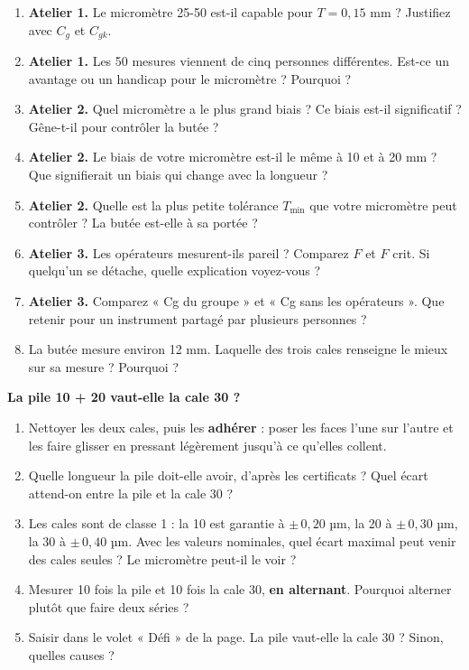 \documentclass[10pt,a4paper]{article}
\begin{document}
\newpage
{}
\begin{enumerate}[label=\textcolor{cyan}{\textbf{Q\arabic*.}},leftmargin=22pt]
\item \textbf{Atelier 1.} Le micromètre 25-50 est-il capable pour $T = 0{,}15$ mm ? Justifiez avec $C_g$ et $C_{gk}$.\reponse
\item \textbf{Atelier 1.} Les 50 mesures viennent de cinq personnes différentes. Est-ce un avantage ou un handicap pour le micromètre ? Pourquoi ?\reponse[2]
\item \textbf{Atelier 2.} Quel micromètre a le plus grand biais ? Ce biais est-il significatif ? Gêne-t-il pour contrôler la butée ?\reponse[2]
\item \textbf{Atelier 2.} Le biais de votre micromètre est-il le même à 10 et à 20 mm ? Que signifierait un biais qui change avec la longueur ?\reponse[2]
\item \textbf{Atelier 2.} Quelle est la plus petite tolérance $T_{\min}$ que votre micromètre peut contrôler ? La butée est-elle à sa portée ?\reponse
\item \textbf{Atelier 3.} Les opérateurs mesurent-ils pareil ? Comparez $F$ et $F$ crit. Si quelqu'un se détache, quelle explication voyez-vous ?\reponse[2]
\item \textbf{Atelier 3.} Comparez « Cg du groupe » et « Cg sans les opérateurs ». Que retenir pour un instrument partagé par plusieurs personnes ?\reponse[2]
\item La butée mesure environ 12 mm. Laquelle des trois cales renseigne le mieux sur sa mesure ? Pourquoi ?\reponse
\end{enumerate}

\begin{tcolorbox}[defi]
\textbf{La pile 10 + 20 vaut-elle la cale 30 ?}
\begin{enumerate}[label=\textbf{\alph*.},leftmargin=14pt]
\item Nettoyer les deux cales, puis les \textbf{adhérer} : poser les faces l'une sur l'autre et les faire glisser en pressant légèrement jusqu'à ce qu'elles collent.
\item Quelle longueur la pile doit-elle avoir, d'après les certificats ? Quel écart attend-on entre la pile et la cale 30 ?
\item Les cales sont de classe 1 : la 10 est garantie à $\pm\,0{,}20$ µm, la 20 à $\pm\,0{,}30$ µm, la 30 à $\pm\,0{,}40$ µm. Avec les valeurs nominales, quel écart maximal peut venir des cales seules ? Le micromètre peut-il le voir ?
\item Mesurer 10 fois la pile et 10 fois la cale 30, \textbf{en alternant}. Pourquoi alterner plutôt que faire deux séries ?
\item Saisir dans le volet « Défi » de la page. La pile vaut-elle la cale 30 ? Sinon, quelles causes ?
\end{enumerate}
\end{tcolorbox}
\end{document}
